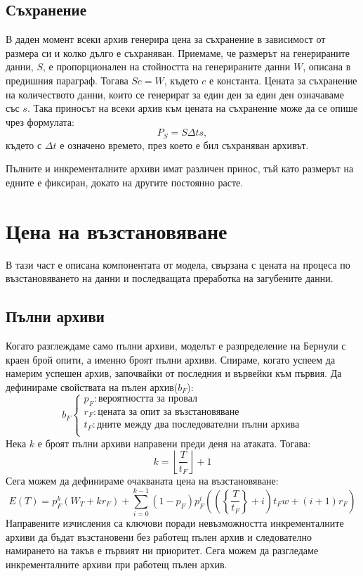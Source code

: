 \documentclass[11pt, a4paper]{article}
\theoremstyle{definition}
\begin{document}
	\subsection{Съхранение}
		В даден момент всеки архив генерира цена за съхранение в зависимост от размера си и колко дълго е съхраняван. Приемаме, че размерът на генерираните данни, $S$, е пропорционален на стойността на генерираните данни $W$, описана в предишния параграф. Тогава $Sc=W$, където $c$ е константа. Цената за съхранение на количеството данни, които се генерират за един ден за един ден означаваме със $s$. Така приносът на всеки архив към цената на съхранение може да се опише чрез формулата:
		$$
			P_S = S\Delta ts,
		$$
		където с $\Delta t$ е означено времето, през което е бил съхраняван архивът.\par\noindent
		Пълните и инкременталните архиви имат различен принос, тъй като размерът на едните е фиксиран, докато на другите постоянно расте.
\section{Цена на възстановяване}\label{Recovery_price}
	В тази част е описана компонентата от модела, свързана с цената на процеса по възстановяването на данни и последващата преработка на загубените данни.
	\subsection{Пълни архиви}
				Когато разглеждаме само пълни архиви, моделът е разпределение на Бернули с краен брой опити, а именно броят пълни архиви. Спираме, когато успеем да намерим успешен архив, започвайки от последния и вървейки към първия. Да дефинираме свойствата на пълен архив($b_F$):
				$$
				b_F
				\begin{cases}
				p_F: \text{вероятността за провал}\\
				r_F: \text{цената за опит за възстановяване}\\
				t_F: \text{дните между два последователни пълни архива}\\
				\end{cases}
				$$
				Нека $k$ е броят пълни архиви направени преди деня на атаката. Тогава:
				$$
				k = \left \lfloor{\frac{T}{t_F}}\right \rfloor + 1
				$$
				Сега можем да дефинираме очакваната цена на възстановяване:
				\begin{equation}
					\label{eq:1}
					E(T) = p_F^{k}\left(W_T + kr_F\right) + \displaystyle \sum_{i=0}^{k-1} 	(1-p_F)p_F^{i}\left( \left (\left\{ \frac{T}{t_F}\right \} + i\right)t_Fw + (i+1)r_F \right )
				\end{equation}
				Направените изчисления са ключови поради невъзможността инкременталните архиви да бъдат възстановени без работещ пълен архив и следователно намирането на такъв е първият ни приоритет. Сега можем да разгледаме инкременталните архиви при работещ пълен архив.
\newpage
\end{document}
